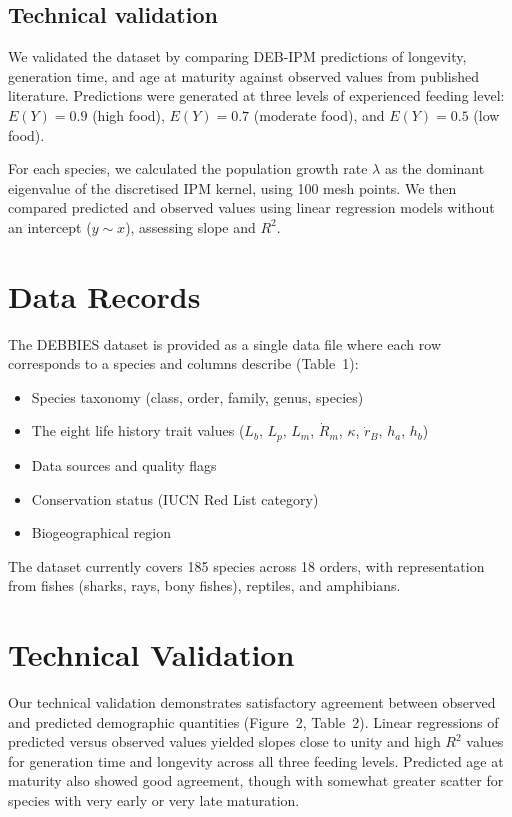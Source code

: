 \documentclass[11pt]{article}
\begin{document}
\subsection{Technical validation}

We validated the dataset by comparing DEB-IPM predictions of longevity, generation time, and age at maturity against observed values from published literature. Predictions were generated at three levels of experienced feeding level: $E(Y) = 0.9$ (high food), $E(Y) = 0.7$ (moderate food), and $E(Y) = 0.5$ (low food).

For each species, we calculated the population growth rate $\lambda$ as the dominant eigenvalue of the discretised IPM kernel, using 100 mesh points. We then compared predicted and observed values using linear regression models without an intercept ($y \sim x$), assessing slope and $R^2$.

\section{Data Records}

The DEBBIES dataset is provided as a single data file where each row corresponds to a species and columns describe (Table~1):

\begin{itemize}
    \item Species taxonomy (class, order, family, genus, species)
    \item The eight life history trait values ($L_b$, $L_p$, $L_m$, $\dot{R}_m$, $\kappa$, $\dot{r}_B$, $h_a$, $h_b$)
    \item Data sources and quality flags
    \item Conservation status (IUCN Red List category)
    \item Biogeographical region
\end{itemize}

The dataset currently covers 185 species across 18 orders, with representation from fishes (sharks, rays, bony fishes), reptiles, and amphibians.

\section{Technical Validation}

Our technical validation demonstrates satisfactory agreement between observed and predicted demographic quantities (Figure~2, Table~2). Linear regressions of predicted versus observed values yielded slopes close to unity and high $R^2$ values for generation time and longevity across all three feeding levels. Predicted age at maturity also showed good agreement, though with somewhat greater scatter for species with very early or very late maturation.
\end{document}
